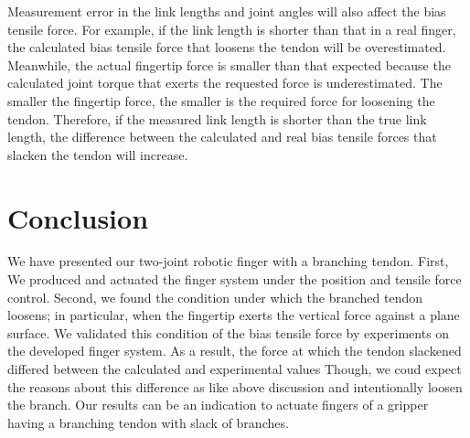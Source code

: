 \documentclass{llncs}
\begin{document}
Measurement error in the link lengths and joint angles will also affect the bias tensile force.
For example,
if the link length is shorter than that in a real finger, the calculated bias tensile force that loosens the tendon will be overestimated.
Meanwhile,
the actual fingertip force is smaller than that expected 
because the calculated joint torque that exerts the requested force is underestimated.%
The smaller the fingertip force, the smaller is the required force for loosening the tendon.
Therefore, if the measured link length is shorter than the true link length,
the difference between the calculated and real bias tensile forces that slacken the tendon will increase.





\section{Conclusion} %
\label{sec:conclusion}
We have presented our two-joint robotic finger with a branching tendon.
First, We produced and actuated the finger system under the position and tensile force control.
Second, we found the condition under which the branched tendon loosens;
in particular, when the fingertip exerts the vertical force against a plane surface.
We validated this condition of the bias tensile force by experiments on the developed finger system.
As a result, the force at which the tendon slackened differed between the calculated and experimental values
Though, we coud expect the reasons about this difference as like above discussion and intentionally loosen the branch.
Our results can be an indication to actuate fingers of a gripper having a branching tendon with slack of branches.
\end{document}
